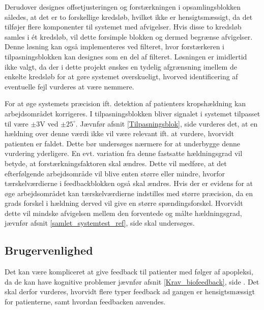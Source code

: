 Derudover designes offsetjusteringen og forstærkningen i opsamlingsblokken således, at det er to forskellige kredsløb, hvilket ikke er hensigtsmæssigt, da det tilføjer flere komponenter til systemet med afvigelser. Hvis disse to kredsløb samles i ét kredsløb, vil dette forsimple blokken og dermed begrænse afvigelser. Denne løsning kan også implementeres ved filteret, hvor forstærkeren i tilpasningsblokken kan designes som en del af filteret. Løsningen er imidlertid ikke valgt, da der i dette projekt ønskes en tydelig afgrænsning imellem de enkelte kredsløb for at gøre systemet overskueligt, hvorved identificering af eventuelle fejl vurderes at være nemmere.

For at øge systemets præcision ift. detektion af patienters kropshældning kan arbejdsområdet korrigeres. I tilpasningsblokken bliver signalet i systemet tilpasset til være $\pm3$V ved $\pm25^{\circ}$. Jævnfør afsnit \ref{Tilpasningsblok}, side \pageref{Tilpasningsblok} vurderes det, at en hældning over denne værdi ikke vil være relevant ift. at vurdere, hvorvidt patienten er faldet. Dette bør undersøges nærmere for at underbygge denne vurdering yderligere. En evt. variation fra denne fastsatte hældningsgrad vil betyde, at forstærkningsfaktoren skal ændres. Dette vil medføre, at det efterfølgende arbejdsområde vil blive enten større eller mindre, hvorfor tærskelværdierne i feedbackblokken også skal ændres. Hvis der er evidens for at øge arbejdsområdet kan tærskelværdierne indstilles med større præcision, da en grads forskel i hældning derved vil give en større spændingsforskel. Hvorvidt dette vil mindske afvigelsen mellem den forventede og målte hældningsgrad, jævnfør afsnit \ref{samlet_systemtest_ref}, side \pageref{samlet_systemtest_ref} skal undersøges. 

\subsection{Brugervenlighed}
Det kan være kompliceret at give feedback til patienter med følger af apopleksi, da de kan have kognitive problemer jævnfør afsnit \ref{Krav_biofeedback}, side \pageref{Krav_biofeedback}. Det skal derfor vurderes, hvorvidt flere typer feedback ad gangen er hensigtsmæssigt for patienterne, samt hvordan feedbacken anvendes.  

